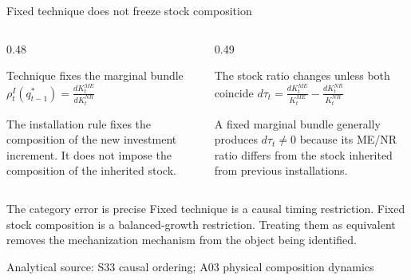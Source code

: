 \documentclass[10pt,aspectratio=169]{beamer}
\newcommand{\sourcefooter}[1]{%
  \par\vfill{\tiny\color{gray!70}Analytical source: #1}\vspace{-0.35em}}
\begin{document}
\begin{frame}{Fixed technique does not freeze stock composition}
  \begin{columns}[T,onlytextwidth]
    \begin{column}{0.48\textwidth}
      \begin{block}{Technique fixes the marginal bundle}
        \centering
        \Large
        $\displaystyle
        \rho_t^I(q_{t-1}^*)
        =\frac{dK_t^{ME}}{dK_t^{NR}}$
      \end{block}
      \small
      The installation rule fixes the composition of the new investment increment. It does not impose the composition of the inherited stock.
    \end{column}
    \begin{column}{0.49\textwidth}
      \begin{block}{The stock ratio changes unless both coincide}
        \centering
        \Large
        $\displaystyle
        d\tau_t
        =\frac{dK_t^{ME}}{K_t^{ME}}
        -\frac{dK_t^{NR}}{K_t^{NR}}$
      \end{block}
      \small
      A fixed marginal bundle generally produces $d\tau_t\neq0$ because its ME/NR ratio differs from the stock inherited from previous installations.
    \end{column}
  \end{columns}
  \vspace{0.7em}
  \begin{alertblock}{The category error is precise}
    Fixed technique is a causal timing restriction. Fixed stock composition is a balanced-growth restriction. Treating them as equivalent removes the mechanization mechanism from the object being identified.
  \end{alertblock}
  \sourcefooter{S33 causal ordering; A03 physical composition dynamics}
\end{frame}
\end{document}
